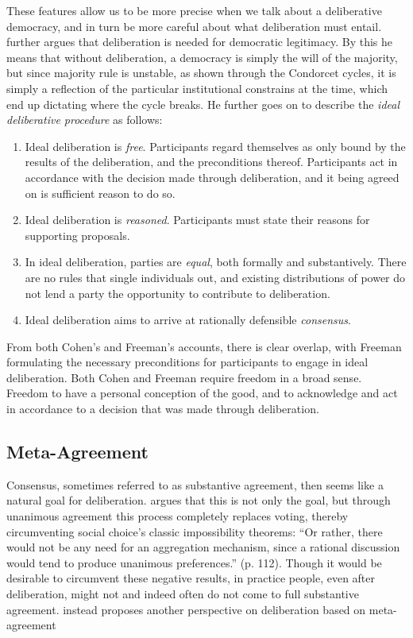 These features allow us to be more precise when we talk about a deliberative
democracy, and in turn be more careful about what deliberation must entail.
\citet{cohenDeliberationDemocraticLegimitimacy2002} further argues that
deliberation is needed for democratic legitimacy. By this he means that without
deliberation, a democracy is simply the will of the majority, but since
majority rule is unstable, as shown through the Condorcet cycles, it is simply
a reflection of the particular institutional constrains at the time, which end
up dictating where the cycle breaks. He further goes on to describe the
\emph{ideal deliberative procedure} as follows:

\begin{enumerate}
	\label{list:ideal-deliberation}
	\setlength\itemsep{1px}
	\item  Ideal deliberation is \emph{free}. Participants regard themselves as only bound by the results of the deliberation, and the preconditions thereof. Participants act in accordance with the decision made through deliberation, and it being agreed on is sufficient reason to do so.
	\item  Ideal deliberation is \emph{reasoned}. Participants must
	      state their reasons for supporting proposals.
	\item  In ideal deliberation, parties are \emph{equal}, both formally
	      and substantively. There are no rules that single individuals
	      out, and existing distributions of power do not lend a party the
	      opportunity to contribute to deliberation.
	\item  Ideal deliberation aims to arrive at rationally defensible \emph{consensus}.
\end{enumerate}

From both Cohen's and Freeman's accounts, there is clear overlap, with Freeman
formulating the necessary preconditions for participants to engage in ideal
deliberation. Both Cohen and Freeman  require freedom in a broad sense. Freedom
to have a personal conception of the good, and to acknowledge and act in
accordance to a decision that was made through deliberation.

\subsection{Meta-Agreement}
\label{subsection:Meta-agreement}

Consensus, sometimes referred to as substantive agreement, then seems like a
natural goal for deliberation. \citet{elsterMarketForumThree2002} argues that
this is not only the goal, but through unanimous agreement this process
completely replaces voting, thereby circumventing social choice's classic impossibility
theorems: ``Or rather, there would not be any need for an aggregation mechanism,
since a rational discussion would tend to produce unanimous preferences.'' (p.
112). Though it would be desirable to circumvent these negative results,
in practice people, even after deliberation, might not and indeed often do not
come to full substantive agreement. \citet{listTwoConceptsAgreement2002}
instead proposes another perspective  on deliberation based on meta-agreement


